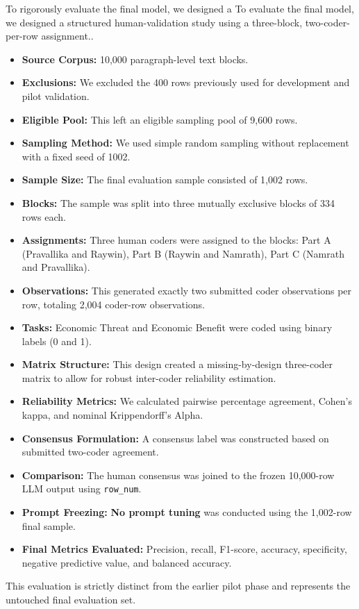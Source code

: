To rigorously evaluate the final model, we designed a To evaluate the final model, we designed a structured human-validation study using a three-block, two-coder-per-row assignment..
\begin{itemize}
    \item \textbf{Source Corpus:} 10,000 paragraph-level text blocks.
    \item \textbf{Exclusions:} We excluded the 400 rows previously used for development and pilot validation.
    \item \textbf{Eligible Pool:} This left an eligible sampling pool of 9,600 rows.
    \item \textbf{Sampling Method:} We used simple random sampling without replacement with a fixed seed of 1002.
    \item \textbf{Sample Size:} The final evaluation sample consisted of 1,002 rows.
    \item \textbf{Blocks:} The sample was split into three mutually exclusive blocks of 334 rows each.
    \item \textbf{Assignments:} Three human coders were assigned to the blocks: Part A (Pravallika and Raywin), Part B (Raywin and Namrath), Part C (Namrath and Pravallika).
    \item \textbf{Observations:} This generated exactly two submitted coder observations per row, totaling 2,004 coder-row observations.
    \item \textbf{Tasks:} Economic Threat and Economic Benefit were coded using binary labels (0 and 1).
    \item \textbf{Matrix Structure:} This design created a missing-by-design three-coder matrix to allow for robust inter-coder reliability estimation.
    \item \textbf{Reliability Metrics:} We calculated pairwise percentage agreement, Cohen's kappa, and nominal Krippendorff's Alpha.
    \item \textbf{Consensus Formulation:} A consensus label was constructed based on submitted two-coder agreement.
    \item \textbf{Comparison:} The human consensus was joined to the frozen 10,000-row LLM output using \texttt{row\_num}.
    \item \textbf{Prompt Freezing:} \textbf{No prompt tuning} was conducted using the 1,002-row final sample.
    \item \textbf{Final Metrics Evaluated:} Precision, recall, F1-score, accuracy, specificity, negative predictive value, and balanced accuracy.
\end{itemize}

This evaluation is strictly distinct from the earlier pilot phase and represents the untouched final evaluation set.

